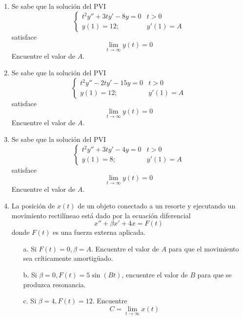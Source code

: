 \begin{enumerate}
\item Se sabe que la solución del PVI
$$\begin{cases}
    t^2y'' + 3ty' - 8y = 0 & t > 0 \\
    y(1) = 12; & y'(1) = A
\end{cases}$$
satisface $$\lim_{t \to \infty} y(t) = 0$$
Encuentre el valor de $A$.

\item Se sabe que la solución del PVI
$$\begin{cases}
    t^2y'' - 2ty' - 15y = 0 & t > 0 \\
    y(1) = 12; & y'(1) = A
\end{cases}$$
satisface $$\lim_{t \to \infty} y(t) = 0$$
Encuentre el valor de $A$.

\item Se sabe que la solución del PVI
$$\begin{cases}
    t^2y'' + 3ty' - 4y = 0 & t > 0 \\
    y(1) = 8; & y'(1) = A
\end{cases}$$
satisface $$\lim_{t \to \infty} y(t) = 0$$
Encuentre el valor de $A$.

\item La posición de $x(t)$ de un objeto conectado a un resorte y ejecutando un movimiento rectilíneao está dado por la ecuación diferencial
$$x'' + \beta x' +4x = F(t)$$
donde $F(t)$ es una fuerza externa aplicada.
\begin{itemize}
    \item[a.] Si $F(t) = 0, \beta = A$. Encuentre el valor de $A$ para que el movimiento sea críticamente amortigüado.
    \item[b.] Si $\beta = 0, F(t) = 5\sin(Bt)$, encuentre el valor de $B$ para que se produzca resonancia.
    \item[c.] Si $\beta = 4, F(t) = 12$. Encuentre $$C = \lim_{t\to \infty} x(t)$$
\end{itemize}


\end{enumerate}

